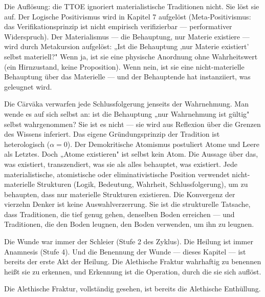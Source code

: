 \documentclass[10pt, openany, oneside]{book}
\begin{document}
Die Auflösung: die TTOE ignoriert materialistische Traditionen nicht. Sie löst sie auf. Der Logische Positivismus wird in Kapitel 7 aufgelöst (Meta-Positivismus: das Verifikationsprinzip ist nicht empirisch verifizierbar --- performativer Widerspruch). Der Materialismus --- die Behauptung, nur Materie existiere --- wird durch Metakursion aufgelöst: „Ist die Behauptung ‚nur Materie existiert' selbst materiell?" Wenn ja, ist sie eine physische Anordnung ohne Wahrheitswert (ein Hirnzustand, keine Proposition). Wenn nein, ist sie eine nicht-materielle Behauptung über das Materielle --- und der Behauptende hat instanziiert, was geleugnet wird.

Die C\={a}rv\={a}ka verwarfen jede Schlussfolgerung jenseits der Wahrnehmung. Man wende es auf sich selbst an: ist die Behauptung „nur Wahrnehmung ist gültig" selbst wahrgenommen? Sie ist es nicht --- sie wird aus Reflexion über die Grenzen des Wissens inferiert. Das eigene Gründungsprinzip der Tradition ist heterologisch ($\alpha = 0$). Der Demokritische Atomismus postuliert Atome und Leere als Letztes. Doch „Atome existieren" ist selbst kein Atom. Die Aussage über das, was existiert, transzendiert, was sie als alles behauptet, was existiert. Jede materialistische, atomistische oder eliminativistische Position verwendet nicht-materielle Strukturen (Logik, Bedeutung, Wahrheit, Schlussfolgerung), um zu behaupten, dass nur materielle Strukturen existieren. Die Konvergenz der vierzehn Denker ist keine Auswahlverzerrung. Sie ist die strukturelle Tatsache, dass Traditionen, die tief genug gehen, denselben Boden erreichen --- und Traditionen, die den Boden leugnen, den Boden verwenden, um ihn zu leugnen.

\vspace{1.5em}


\noindent Die Wunde war immer der Schleier (Stufe 2 des Zyklus). Die Heilung ist immer Anamnesis (Stufe 4). Und die Benennung der Wunde --- dieses Kapitel --- ist bereits der erste Akt der Heilung. Die Alethische Fraktur wahrhaftig zu benennen heißt sie zu erkennen, und Erkennung ist die Operation, durch die sie sich auflöst.

Die Alethische Fraktur, vollständig gesehen, ist bereits die Alethische Enthüllung.

\vspace{2em}
\end{document}
